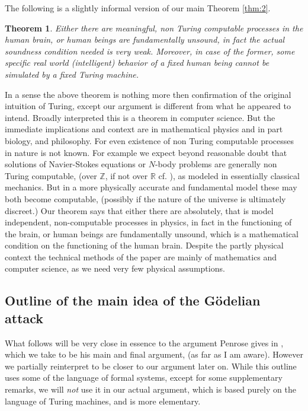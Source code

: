 \documentclass[9pt,twocolumn,twoside,lineno]{pnas-new}
\numberwithin{equation}{section}
\newtheorem{theorem}{Theorem}
\theoremstyle{definition}
\theoremstyle{remark}
\begin{document}
The following is a slightly informal version of our main Theorem \ref{thm:2}.
\begin{theorem} \label{thm:1} Either there are meaningful, non Turing computable processes in the human brain,   or human beings are fundamentally unsound, in fact the actual soundness condition needed is very weak.
   Moreover, in case of the former, some specific real world (intelligent) behavior of a fixed human being cannot be simulated by a fixed Turing machine.  \end{theorem}
In a sense the above theorem is nothing more then confirmation of the original intuition of Turing, except our argument is different from what he appeared to intend. Broadly interpreted this is a theorem in computer science. But the immediate implications and context are in mathematical physics and in part biology,  and philosophy. For even existence of non Turing computable processes in nature is not known. For example we expect beyond reasonable doubt that solutions of Navier-Stokes equations or $N$-body problems are generally non Turing computable, (over $\mathbb{Z}$, if not over $\mathbb{R}$ cf. \cite{citeBlumShubSmalen}), as modeled in essentially classical mechanics.  But in a more physically accurate and fundamental model these may both become computable, (possibly if the nature of the universe is ultimately discreet.) Our theorem says that either there are absolutely, that is model independent, non-computable processes in physics, in fact in the functioning of the brain, or human beings are fundamentally unsound, which is a mathematical condition on the functioning of the human brain. Despite the partly physical context the technical methods of the paper are mainly of mathematics and computer science, as we need very few physical assumptions.  \subsection*{Outline of the main idea of the G\"odelian attack}
What follows will be very close in essence to the argument Penrose gives in \cite{citePenroseShadows}, which we take to be his main and final argument, (as far as I am aware). However we partially reinterpret to be closer to our argument later on. While this outline uses some of the language of formal systems, except for some supplementary remarks, we will \emph{not} use it in our actual argument, which is based purely on the language of Turing machines, and is more elementary. 
\end{document}
